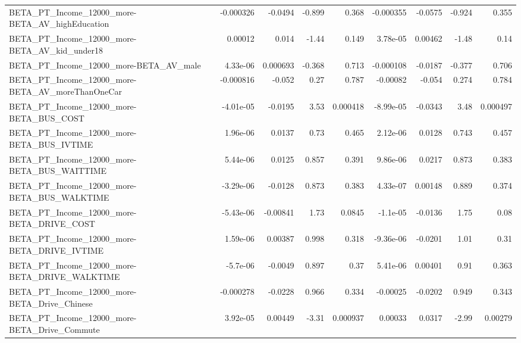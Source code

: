 \begin{tabular}{lrrrrrrrr}
BETA\_PT\_Income\_12000\_more-BETA\_AV\_highEducation    &   -0.000326 &      -0.0494 &   -0.899 &    0.368 &  -0.000355 &     -0.0575 &       -0.924 &         0.355 \\
BETA\_PT\_Income\_12000\_more-BETA\_AV\_kid\_under18      &     0.00012 &        0.014 &    -1.44 &    0.149 &   3.78e-05 &     0.00462 &        -1.48 &          0.14 \\
BETA\_PT\_Income\_12000\_more-BETA\_AV\_male             &    4.33e-06 &     0.000693 &   -0.368 &    0.713 &  -0.000108 &     -0.0187 &       -0.377 &         0.706 \\
BETA\_PT\_Income\_12000\_more-BETA\_AV\_moreThanOneCar   &   -0.000816 &       -0.052 &     0.27 &    0.787 &   -0.00082 &      -0.054 &        0.274 &         0.784 \\
BETA\_PT\_Income\_12000\_more-BETA\_BUS\_COST            &   -4.01e-05 &      -0.0195 &     3.53 & 0.000418 &  -8.99e-05 &     -0.0343 &         3.48 &      0.000497 \\
BETA\_PT\_Income\_12000\_more-BETA\_BUS\_IVTIME          &    1.96e-06 &       0.0137 &     0.73 &    0.465 &   2.12e-06 &      0.0128 &        0.743 &         0.457 \\
BETA\_PT\_Income\_12000\_more-BETA\_BUS\_WAITTIME        &    5.44e-06 &       0.0125 &    0.857 &    0.391 &   9.86e-06 &      0.0217 &        0.873 &         0.383 \\
BETA\_PT\_Income\_12000\_more-BETA\_BUS\_WALKTIME        &   -3.29e-06 &      -0.0128 &    0.873 &    0.383 &   4.33e-07 &     0.00148 &        0.889 &         0.374 \\
BETA\_PT\_Income\_12000\_more-BETA\_DRIVE\_COST          &   -5.43e-06 &     -0.00841 &     1.73 &   0.0845 &   -1.1e-05 &     -0.0136 &         1.75 &          0.08 \\
BETA\_PT\_Income\_12000\_more-BETA\_DRIVE\_IVTIME        &    1.59e-06 &      0.00387 &    0.998 &    0.318 &  -9.36e-06 &     -0.0201 &         1.01 &          0.31 \\
BETA\_PT\_Income\_12000\_more-BETA\_DRIVE\_WALKTIME      &    -5.7e-06 &      -0.0049 &    0.897 &     0.37 &   5.41e-06 &     0.00401 &         0.91 &         0.363 \\
BETA\_PT\_Income\_12000\_more-BETA\_Drive\_Chinese       &   -0.000278 &      -0.0228 &    0.966 &    0.334 &   -0.00025 &     -0.0202 &        0.949 &         0.343 \\
BETA\_PT\_Income\_12000\_more-BETA\_Drive\_Commute       &    3.92e-05 &      0.00449 &    -3.31 & 0.000937 &    0.00033 &      0.0317 &        -2.99 &       0.00279 \\

\end{tabular}
